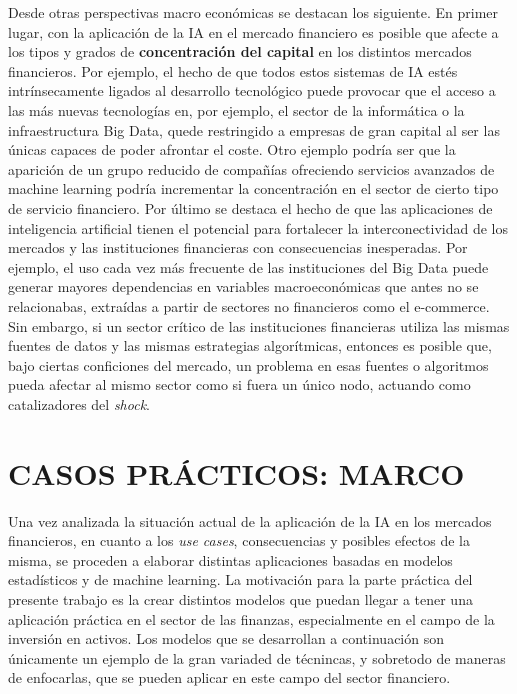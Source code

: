 \documentclass[]{DissertateUSU}
\begin{document}
\noindent Desde otras perspectivas macro económicas se destacan los
siguiente. En primer lugar, con la aplicación de la IA en el mercado
financiero es posible que afecte a los tipos y grados de
\textbf{concentración del capital} en los distintos mercados
financieros. Por ejemplo, el hecho de que todos estos sistemas de IA
estés intrínsecamente ligados al desarrollo tecnológico puede provocar
que el acceso a las más nuevas tecnologías en, por ejemplo, el sector de
la informática o la infraestructura Big Data, quede restringido a
empresas de gran capital al ser las únicas capaces de poder afrontar el
coste. Otro ejemplo podría ser que la aparición de un grupo reducido de
compañías ofreciendo servicios avanzados de machine learning podría
incrementar la concentración en el sector de cierto tipo de servicio
financiero. Por último se destaca el hecho de que las aplicaciones de
inteligencia artificial tienen el potencial para fortalecer la
interconectividad de los mercados y las instituciones financieras con
consecuencias inesperadas. Por ejemplo, el uso cada vez más frecuente de
las instituciones del Big Data puede generar mayores dependencias en
variables macroeconómicas que antes no se relacionabas, extraídas a
partir de sectores no financieros como el e-commerce. Sin embargo, si un
sector crítico de las instituciones financieras utiliza las mismas
fuentes de datos y las mismas estrategias algorítmicas, entonces es
posible que, bajo ciertas conficiones del mercado, un problema en esas
fuentes o algoritmos pueda afectar al mismo sector como si fuera un
único nodo, actuando como catalizadores del \emph{shock}.

\FloatBarrier
\newpage
{}
\fancyhead[R]{\thepage}
\fancyfoot[C]{}

\chapter{\textbf{CASOS PRÁCTICOS: MARCO}}
\justifying

\noindent Una vez analizada la situación actual de la aplicación de la
IA en los mercados financieros, en cuanto a los \emph{use cases},
consecuencias y posibles efectos de la misma, se proceden a elaborar
distintas aplicaciones basadas en modelos estadísticos y de machine
learning. La motivación para la parte práctica del presente trabajo es
la crear distintos modelos que puedan llegar a tener una aplicación
práctica en el sector de las finanzas, especialmente en el campo de la
inversión en activos. Los modelos que se desarrollan a continuación son
únicamente un ejemplo de la gran variaded de técnincas, y sobretodo de
maneras de enfocarlas, que se pueden aplicar en este campo del sector
financiero.
\end{document}
